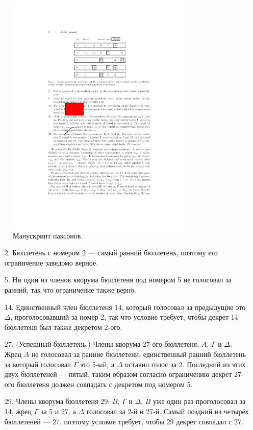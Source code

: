 \documentclass[12pt, a4paper]{article} %
\begin{document}
\begin{figure}[h]
 \centering
    \includegraphics[width=0.8\textwidth]{images/Paxon-manuscript.pdf}
    \caption{Манускрипт паксонов.}
    \label{fig:paxonmanu}
\end{figure}

\begin{itemize}
    \item[2.] Бюллетень с номером 2 --- самый ранний бюллетень, поэтому его ограничение заведомо верное.
    \item[5.] Ни один из членов кворума бюллетеня под номером 5 не голосовал за ранний, так что ограничение также верно.
    \item[14.] Единственный член бюллетеня 14, который голосовал за предыдущие это $\Delta$, проголосовавший за номер 2, так что условие требует, чтобы декрет 14 бюллетеня был также декретом 2-ого.
    \item[27.] (Успешный бюллетень.) Члены кворума 27-ого бюллетеня: $A$, $\Gamma$ и $\Delta$. Жрец $A$ не голосовал за ранние бюллетени, единственный ранний бюллетень за который голосовал $\Gamma$ это 5-ый, а $\Delta$ оставил голос за 2. Последний из этих двух бюллетеней --- пятый, таким образом согласно ограничению декрет 27-ого бюллетеня должен совпадать с декретом под номером 5.
    \item[29.] Члены кворума бюллетеня 29: $B$, $\Gamma$ и $\Delta$. $B$ уже один раз проголосовал за 14, жрец $\Gamma$ за 5 и 27, а $\Delta$ голосовал за 2-й и 27-й. Самый поздний из четырёх бюллетеней --- 27, поэтому условие требует, чтобы 29 декрет совпадал с 27.
\end{itemize}
\end{document}
